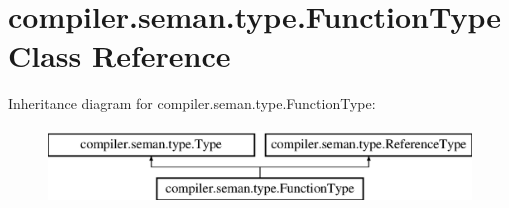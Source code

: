\hypertarget{classcompiler_1_1seman_1_1type_1_1_function_type}{}\section{compiler.\+seman.\+type.\+Function\+Type Class Reference}
\label{classcompiler_1_1seman_1_1type_1_1_function_type}
Inheritance diagram for compiler.\+seman.\+type.\+Function\+Type\+:\begin{figure}[H]
\begin{center}
\leavevmode
\includegraphics[height=2.000000cm]{classcompiler_1_1seman_1_1type_1_1_function_type}
\end{center}
\end{figure}
